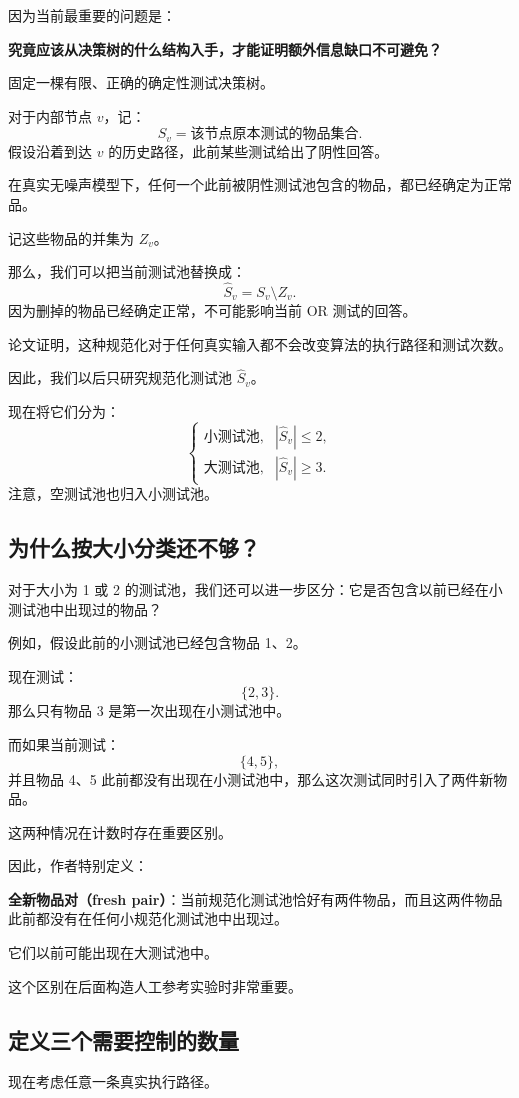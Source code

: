 \documentclass[UTF8,11pt]{ctexart}
\begin{document}
因为当前最重要的问题是：

\textbf{究竟应该从决策树的什么结构入手，才能证明额外信息缺口不可避免？}

固定一棵有限、正确的确定性测试决策树。

对于内部节点 $v$，记：
\[S_v=\text{该节点原本测试的物品集合}.\]
假设沿着到达 $v$ 的历史路径，此前某些测试给出了阴性回答。

在真实无噪声模型下，任何一个此前被阴性测试池包含的物品，都已经确定为正常品。

记这些物品的并集为 $Z_v$。

那么，我们可以把当前测试池替换成：
\begin{equation}\boxed{\widehat S_v=S_v\setminus Z_v.}\tag{15}\end{equation}
因为删掉的物品已经确定正常，不可能影响当前 OR 测试的回答。

论文证明，这种规范化对于任何真实输入都不会改变算法的执行路径和测试次数。

因此，我们以后只研究规范化测试池 $\widehat S_v$。

现在将它们分为：
\[
\begin{cases}
\text{小测试池},&|\widehat S_v|\le2,\\
\text{大测试池},&|\widehat S_v|\ge3.
\end{cases}
\]
注意，空测试池也归入小测试池。

\subsection{为什么按大小分类还不够？}
对于大小为 1 或 2 的测试池，我们还可以进一步区分：它是否包含以前已经在小测试池中出现过的物品？

例如，假设此前的小测试池已经包含物品 1、2。

现在测试：
\[\{2,3\}.\]
那么只有物品 3 是第一次出现在小测试池中。

而如果当前测试：
\[\{4,5\},\]
并且物品 4、5 此前都没有出现在小测试池中，那么这次测试同时引入了两件新物品。

这两种情况在计数时存在重要区别。

因此，作者特别定义：

\textbf{全新物品对（fresh pair）}：当前规范化测试池恰好有两件物品，而且这两件物品此前都没有在任何小规范化测试池中出现过。

它们以前可能出现在大测试池中。

这个区别在后面构造人工参考实验时非常重要。

\subsection{定义三个需要控制的数量}
现在考虑任意一条真实执行路径。
\end{document}
